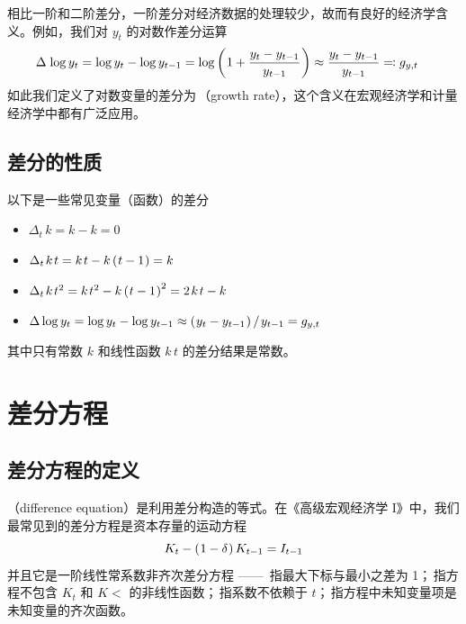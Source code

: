 相比一阶和二阶差分，一阶差分对经济数据的处理较少，故而有良好的经济学含义。例如，我们对 \(y_t\) 的对数作差分运算
\begin{align}
    \Delta\mspace{2mu} \operatorname{log} y_t &= \operatorname{log} y_t - \operatorname{log} y_{t-1} = \operatorname{log}\left(\mspace{1mu}1+\dfrac{y_t-y_{t-1}}{y_{t-1}}\mspace{1mu}\right) \approx \frac{y_t - y_{t-1}}{y_{t-1}} \eqcolon g_{y,t}
\end{align}
如此我们定义了对数变量的差分为\,（growth rate），这个含义在宏观经济学和计量经济学中都有广泛应用。

\subsection{差分的性质}\label{subsec:DiffProp}

以下是一些常见变量（函数）的差分
\begin{itemize}
    \item \(\Delta_t\, k = k-k=0\)
    \item \(\Delta_t\, k\,t = k\,t-k\bka{t-1}=k\)
    \item \(\Delta_t\, k\,t^2=k\,t^2-k\bka{t-1}^2=2\,k\,t-k\)
    \item \(\Delta\log y_t=\log y_t-\log y\lt\approx\bka{y_t-y\lt}/\,y\lt=g_{y,t}\)
\end{itemize}
其中只有常数 \(k\) 和线性函数 \(k\,t\) 的差分结果是常数。


\section{差分方程}\label{sec:DiffEqu}

\subsection{差分方程的定义}\label{subsec:DiffEquDef}

（difference equation）是利用差分构造的等式。在《高级宏观经济学 I》中，我们最常见到的差分方程是资本存量的运动方程
\begin{equation}
    K_t - \left(\mspace{1mu}1-\delta\mspace{1mu}\right) K_{t-1} = I_{t-1}\notag
\end{equation}
并且它是一阶线性常系数非齐次差分方程 —— \,指最大下标与最小之差为 1；\,指方程不包含 \(K_t\) 和 \(K\lt\) 的非线性函数；\,指系数不依赖于 \(t\)；\,指方程中未知变量项是未知变量的齐次函数。

